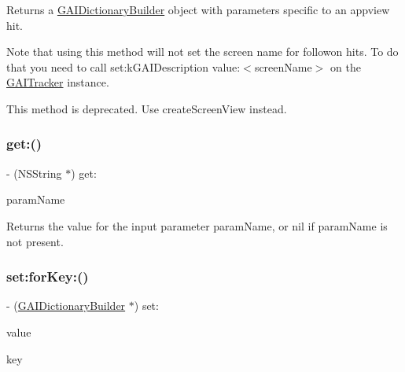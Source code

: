 Returns a \hyperlink{interface_g_a_i_dictionary_builder}{G\+A\+I\+Dictionary\+Builder} object with parameters specific to an appview hit.

Note that using this method will not set the screen name for followon hits. To do that you need to call set\+:k\+G\+A\+I\+Description value\+:$<$screen\+Name$>$ on the \hyperlink{protocol_g_a_i_tracker-p}{G\+A\+I\+Tracker} instance.

This method is deprecated. Use create\+Screen\+View instead. \mbox{\label{interface_g_a_i_dictionary_builder_ae26c0c8d91b6f5d2baa09e2126a14512}} 
\subsubsection{\texorpdfstring{get\+:()}{get:()}}
{\footnotesize\ttfamily -\/ (N\+S\+String $\ast$) get\+: \begin{DoxyParamCaption}\item[{(N\+S\+String $\ast$)}]{param\+Name }\end{DoxyParamCaption}}

Returns the value for the input parameter param\+Name, or nil if param\+Name is not present. \mbox{\label{interface_g_a_i_dictionary_builder_a4a54d53231f907c632641dcc462a2c86}} 
\subsubsection{\texorpdfstring{set\+:for\+Key\+:()}{set:forKey:()}}
{\footnotesize\ttfamily -\/ (\hyperlink{interface_g_a_i_dictionary_builder}{G\+A\+I\+Dictionary\+Builder} $\ast$) set\+: \begin{DoxyParamCaption}\item[{(N\+S\+String $\ast$)}]{value }\item[{forKey:(N\+S\+String $\ast$)}]{key }\end{DoxyParamCaption}}

\mbox{\label{interface_g_a_i_dictionary_builder_a8201487fc71afe66736ab388bf412e50}} 

